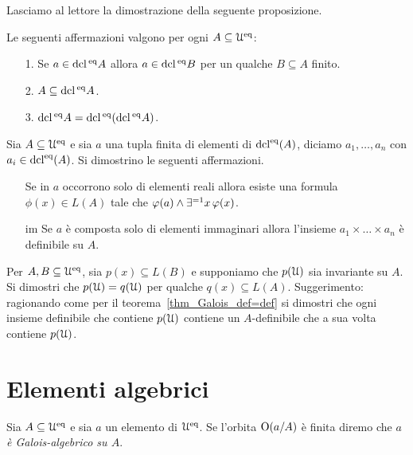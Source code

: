 Lasciamo al lettore la dimostrazione della seguente proposizione.

\begin{proposition}\label{dcl123} Le seguenti affermazioni valgono per ogni $A\subseteq\EuScript U^{\rm eq}$:
\begin{itemize}
\item[1.]  Se $a\in\mathop{\rm dcl}\/^{\rm eq} A$ allora $a\in\mathop{\rm dcl}\/^{\rm eq} B$ per un qualche $B\subseteq A$ finito.
\item[2.]  $A\subseteq \mathop{\rm dcl}\/^{\rm eq} A$.
\item[3.]  $\mathop{\rm dcl}\/^{\rm eq} A=\mathop{\rm dcl}\/^{\rm eq}(\mathop{\rm dcl}\/^{\rm eq} A)$.\QED
\end{itemize} 
\end{proposition}

\begin{exercise}\label{definibilituple}
Sia $A\subseteq\EuScript U^{\rm eq}$ e sia $a$ una tupla finita di elementi di $\mathop{\rm dcl}^{\rm eq}(A)$, diciamo $a_1,\dots,a_n$ con $a_i\in\mathop{\rm dcl}^{\rm eq}(A)$. Si dimostrino le seguenti affermazioni.
\begin{itemize}
\item[\re] Se in $a$ occorrono solo di elementi reali allora esiste una formula $\phi(x)\in L(A)$ tale che $\varphi(a)\wedge\exists ^{=1}x\,\varphi(x)$. 
\item[im] Se $a$ \`e composta solo di elementi immaginari allora l'insieme $a_1\times\dots\times a_n$ \`e definibile su $A$.\QED
\end{itemize}
\end{exercise}


\begin{exercise}
Per $A,B\subseteq\EuScript U^{\rm eq}$, sia $p(x)\subseteq L(B)$ e supponiamo che $p(\EuScript U)$ sia invariante su $A$. Si dimostri che $p(\EuScript U)=q(\EuScript U)$ per qualche $q(x)\subseteq L(A)$.  Suggerimento: ragionando come per il teorema~\ref{thm_Galois_def=def} si dimostri che ogni insieme definibile che contiene $p(\EuScript U)$ contiene un $A$-definibile che a sua volta contiene $p(\EuScript U)$.
\end{exercise}




\section{Elementi algebrici}\label{chiusura algebrica}

Sia $A\subseteq\EuScript U^{\rm eq}$ e sia $a$ un elemento di $\EuScript U^{\rm eq}$. Se l'orbita $\textrm{O}(a/A)$ \`e finita diremo che \emph{$a$ \`e Galois-algebrico su $A$}.

